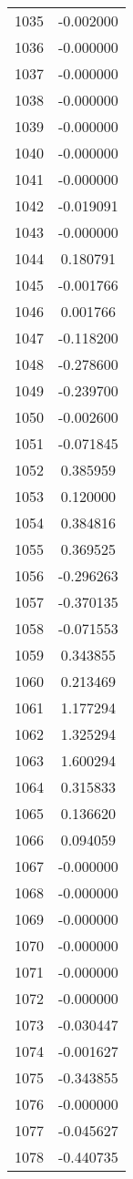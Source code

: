 \documentclass[12pt]{article}
\begin{document}
\begin{longtable}{@{}cc@{}}
1035 & -0.002000 \\
1036 & -0.000000 \\
1037 & -0.000000 \\
1038 & -0.000000 \\
1039 & -0.000000 \\
1040 & -0.000000 \\
1041 & -0.000000 \\
1042 & -0.019091 \\
1043 & -0.000000 \\
1044 & 0.180791 \\
1045 & -0.001766 \\
1046 & 0.001766 \\
1047 & -0.118200 \\
1048 & -0.278600 \\
1049 & -0.239700 \\
1050 & -0.002600 \\
1051 & -0.071845 \\
1052 & 0.385959 \\
1053 & 0.120000 \\
1054 & 0.384816 \\
1055 & 0.369525 \\
1056 & -0.296263 \\
1057 & -0.370135 \\
1058 & -0.071553 \\
1059 & 0.343855 \\
1060 & 0.213469 \\
1061 & 1.177294 \\
1062 & 1.325294 \\
1063 & 1.600294 \\
1064 & 0.315833 \\
1065 & 0.136620 \\
1066 & 0.094059 \\
1067 & -0.000000 \\
1068 & -0.000000 \\
1069 & -0.000000 \\
1070 & -0.000000 \\
1071 & -0.000000 \\
1072 & -0.000000 \\
1073 & -0.030447 \\
1074 & -0.001627 \\
1075 & -0.343855 \\
1076 & -0.000000 \\
1077 & -0.045627 \\
1078 & -0.440735 \\

\end{longtable}
\end{document}
